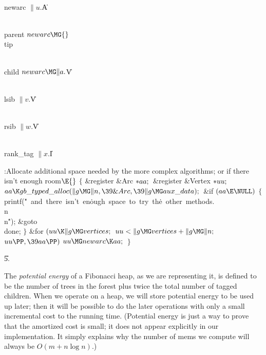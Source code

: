 \Y\B\4\D\\{newarc}\5
$\|u.{}$\|A\par
\B\4\D\\{parent}\5
$\\{newarc}\MG{}$\\{tip}\par
\B\4\D\\{child}\5
$\\{newarc}\MG\|a.{}$\|V\par
\B\4\D\\{lsib}\5
$\|v.{}$\|V\par
\B\4\D\\{rsib}\5
$\|w.{}$\|V\par
\B\4\D\\{rank\_tag}\5
$\|x.{}$\|I\par
\Y\B\4:Allocate additional space needed by the more complex algorithms; or %
 if there isn't enough room\X${}\E{}$\6
${}\{{}$\5
\1\&{register} \&{Arc} ${}{*}\\{aa};{}$\6
\&{register} \&{Vertex} ${}{*}\\{uu};{}$\7
${}\\{aa}\K\\{gb\_typed\_alloc}(\|g\MG\|n,\39\&{Arc},\39\|g\MG\\{aux%
\_data});{}$\6
\&{if} ${}(\\{aa}\E\NULL){}$\5
${}\{{}$\1\6
\\{printf}(\.{"\ and\ there\ isn't\ en}\)\.{ough\ space\ to\ try\ th}\)\.{e\
other\ methods.\\n\\n}\)\.{"});\6
\&{goto} \\{done};\6
\4${}\}{}$\2\6
\&{for} ${}(\\{uu}\K\|g\MG\\{vertices};{}$ ${}\\{uu}<\|g\MG\\{vertices}+\|g\MG%
\|n;{}$ ${}\\{uu}\PP,\39\\{aa}\PP){}$\1\5
${}\\{uu}\MG\\{newarc}\K\\{aa};{}$\2\6
\4${}\}{}$\2\par
\U5.\fi

The {\sl potential energy\/} of a Fibonacci heap, as we are
representing it, is defined to be the number of trees in the forest
plus twice the total number of tagged children. When we operate on a
heap, we will store potential energy to be used up later; then it will
be possible to do the later operations with only a small incremental
cost to the running time. (Potential energy is just a way to prove
that the amortized cost is small; it does not appear explicitly in our
implementation. It simply explains why the number of mems we compute
will always be $O(m+n\log n)$.)

